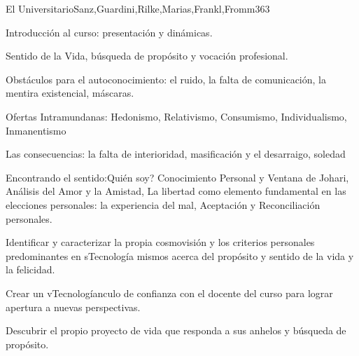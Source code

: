 \begin{syllabus}
\begin{unit}{El Universitario}{Sanz,Guardini,Rilke,Marias,Frankl,Fromm}{36}{3}
\begin{topics}
	\item Introducción al curso: presentación y dinámicas.
	\item Sentido de la Vida, búsqueda de propósito y vocación profesional.
	\item Obstáculos para el autoconocimiento: el ruido, la falta de comunicación, la mentira existencial, máscaras.
	\item Ofertas Intramundanas: Hedonismo, Relativismo, Consumismo, Individualismo, Inmanentismo
	\item Las consecuencias: la falta de interioridad, masificación y el desarraigo, soledad
	\item Encontrando el sentido:Quién soy? Conocimiento Personal y Ventana de Johari, Análisis del Amor y la Amistad, La libertad como elemento fundamental en las elecciones personales: la experiencia del mal, Aceptación y Reconciliación personales.
\end{topics}
\begin{unitgoals}
	\item Identificar y caracterizar la propia cosmovisión y los criterios personales predominantes en sTecnología mismos acerca del propósito y sentido de la vida y la felicidad.
	\item Crear un vTecnologíanculo de confianza con el docente del curso para lograr apertura a nuevas perspectivas.
	\item Descubrir el propio proyecto de vida que responda a sus anhelos y búsqueda de propósito.
\end{unitgoals}
\end{unit}


\end{syllabus}
